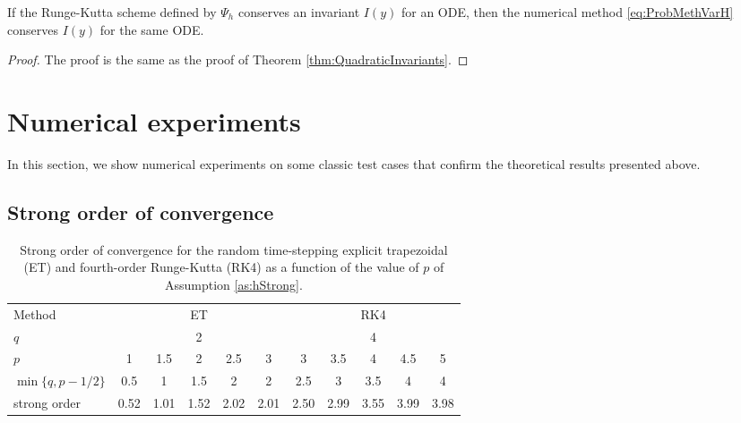 \documentclass{siamart1116}
\numberwithin{theorem}{section}
\begin{document}
\begin{theorem}\label{thm:PolyInvariants} If the Runge-Kutta scheme defined by $\Psi_h$ conserves an invariant $I(y)$ for an ODE, then the numerical method \eqref{eq:ProbMethVarH} conserves $I(y)$ for the same ODE.
\end{theorem}
\begin{proof} The proof is the same as the proof of Theorem \ref{thm:QuadraticInvariants}.
\end{proof}

\section{Numerical experiments} 

In this section, we show numerical experiments on some classic test cases that confirm the theoretical results presented above.

\subsection{Strong order of convergence}

\begin{table}[!t]
	\centering
	\begin{tabular}{lcccccccccc}
		\toprule
		Method & \multicolumn{5}{c}{ET} & \multicolumn{5}{c}{RK4} \\ 
		\cmidrule(l{2pt}r{2pt}){2-6} \cmidrule(l{2pt}r{2pt}){7-11} 
		$q$ & \multicolumn{5}{c}{2} & \multicolumn{5}{c}{4} \\
		$p$ & 1 & 1.5 & 2 & 2.5 & 3 & 3 & 3.5 & 4 & 4.5 & 5\\
		$\min\{q, p - 1/2\}$ & 0.5 & 1 & 1.5 & 2 & 2 & 2.5 & 3 & 3.5 & 4 & 4 \\
		strong order & 0.52 & 1.01 & 1.52 & 2.02 & 2.01 & 2.50 & 2.99 & 3.55 & 3.99 & 3.98 \\
		\bottomrule
	\end{tabular}
	\caption{Strong order of convergence for the random time-stepping explicit trapezoidal (ET) and fourth-order Runge-Kutta (RK4) as a function of the value of $p$ of Assumption \ref{as:hStrong}.}
	\label{tab:NumericalResultsStrongOrder}
\end{table}
\end{document}
